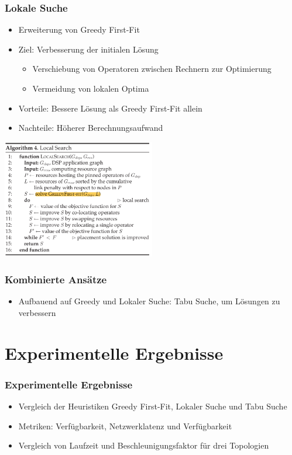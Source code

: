 \documentclass{beamer}
\begin{document}
\begin{frame}
\frametitle{Lokale Suche}
\begin{itemize}
    \item Erweiterung von Greedy First-Fit
    \item Ziel: Verbesserung der initialen Lösung
    \begin{itemize}
        \item Verschiebung von Operatoren zwischen Rechnern zur Optimierung
        \item Vermeidung von lokalen Optima
    \end{itemize}
    \item Vorteile: Bessere Lösung als Greedy First-Fit allein
    \item Nachteile: Höherer Berechnungsaufwand
\end{itemize}
\includegraphics[width=0.5\textwidth]{res/algorithmus-lokale-suche.png} \\
\end{frame}

\begin{frame}
\frametitle{Kombinierte Ansätze}
\begin{itemize}
    \item Aufbauend auf Greedy und Lokaler Suche: Tabu Suche, um Lösungen zu verbessern

\end{itemize}
\end{frame}

\section{Experimentelle Ergebnisse}
\begin{frame}
\frametitle{Experimentelle Ergebnisse}
\begin{itemize}
    \item Vergleich der Heuristiken Greedy First-Fit, Lokaler Suche und Tabu Suche
    \item Metriken: Verfügbarkeit, Netzwerklatenz und Verfügbarkeit
    \item Vergleich von Laufzeit und Beschleunigungsfaktor für drei Topologien
    
\end{itemize}
\vspace{0.3cm}

\end{frame}
\end{document}
